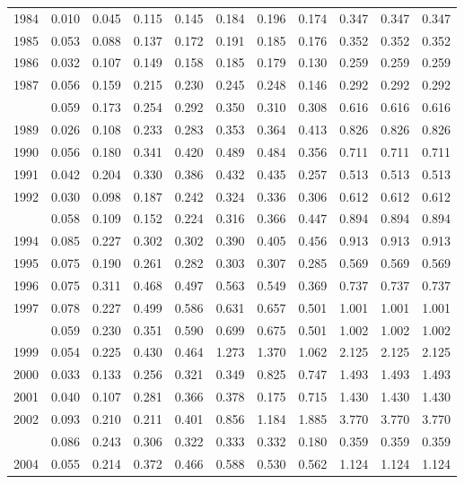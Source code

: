 \documentclass[
]{article}
\begin{document}
\begin{longtable}[t]{lrrrrrrrrrr}
1984 & 0.010 & 0.045 & 0.115 & 0.145 & 0.184 & 0.196 & 0.174 & 0.347 & 0.347 & 0.347\\
1985 & 0.053 & 0.088 & 0.137 & 0.172 & 0.191 & 0.185 & 0.176 & 0.352 & 0.352 & 0.352\\
1986 & 0.032 & 0.107 & 0.149 & 0.158 & 0.185 & 0.179 & 0.130 & 0.259 & 0.259 & 0.259\\
1987 & 0.056 & 0.159 & 0.215 & 0.230 & 0.245 & 0.248 & 0.146 & 0.292 & 0.292 & 0.292\\
\addlinespace
1988 & 0.059 & 0.173 & 0.254 & 0.292 & 0.350 & 0.310 & 0.308 & 0.616 & 0.616 & 0.616\\
1989 & 0.026 & 0.108 & 0.233 & 0.283 & 0.353 & 0.364 & 0.413 & 0.826 & 0.826 & 0.826\\
1990 & 0.056 & 0.180 & 0.341 & 0.420 & 0.489 & 0.484 & 0.356 & 0.711 & 0.711 & 0.711\\
1991 & 0.042 & 0.204 & 0.330 & 0.386 & 0.432 & 0.435 & 0.257 & 0.513 & 0.513 & 0.513\\
1992 & 0.030 & 0.098 & 0.187 & 0.242 & 0.324 & 0.336 & 0.306 & 0.612 & 0.612 & 0.612\\
\addlinespace
1993 & 0.058 & 0.109 & 0.152 & 0.224 & 0.316 & 0.366 & 0.447 & 0.894 & 0.894 & 0.894\\
1994 & 0.085 & 0.227 & 0.302 & 0.302 & 0.390 & 0.405 & 0.456 & 0.913 & 0.913 & 0.913\\
1995 & 0.075 & 0.190 & 0.261 & 0.282 & 0.303 & 0.307 & 0.285 & 0.569 & 0.569 & 0.569\\
1996 & 0.075 & 0.311 & 0.468 & 0.497 & 0.563 & 0.549 & 0.369 & 0.737 & 0.737 & 0.737\\
1997 & 0.078 & 0.227 & 0.499 & 0.586 & 0.631 & 0.657 & 0.501 & 1.001 & 1.001 & 1.001\\
\addlinespace
1998 & 0.059 & 0.230 & 0.351 & 0.590 & 0.699 & 0.675 & 0.501 & 1.002 & 1.002 & 1.002\\
1999 & 0.054 & 0.225 & 0.430 & 0.464 & 1.273 & 1.370 & 1.062 & 2.125 & 2.125 & 2.125\\
2000 & 0.033 & 0.133 & 0.256 & 0.321 & 0.349 & 0.825 & 0.747 & 1.493 & 1.493 & 1.493\\
2001 & 0.040 & 0.107 & 0.281 & 0.366 & 0.378 & 0.175 & 0.715 & 1.430 & 1.430 & 1.430\\
2002 & 0.093 & 0.210 & 0.211 & 0.401 & 0.856 & 1.184 & 1.885 & 3.770 & 3.770 & 3.770\\
\addlinespace
2003 & 0.086 & 0.243 & 0.306 & 0.322 & 0.333 & 0.332 & 0.180 & 0.359 & 0.359 & 0.359\\
2004 & 0.055 & 0.214 & 0.372 & 0.466 & 0.588 & 0.530 & 0.562 & 1.124 & 1.124 & 1.124\\

\end{longtable}
\end{document}
